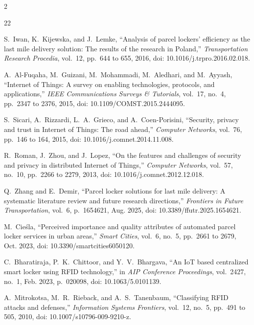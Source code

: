 \documentclass[journal,onecolumn]{IEEEtran}
\begin{document}
\begingroup
\def\IEEEbibitemsep{0pt}
\def\footnotesize{\fontsize{7.0pt}{8.0pt}\selectfont}
\setlength{\multicolsep}{2pt plus 1pt minus 1pt}
\begin{multicols}{2}
\begin{thebibliography}{22}

S.~Iwan, K.~Kijewska, and J.~Lemke, ``Analysis of parcel lockers' efficiency as the last mile delivery solution: The results of the research in Poland,'' \emph{Transportation Research Procedia}, vol.~12, pp.~644 to 655, 2016, doi: 10.1016/j.trpro.2016.02.018.

A.~Al-Fuqaha, M.~Guizani, M.~Mohammadi, M.~Aledhari, and M.~Ayyash, ``Internet of Things: A survey on enabling technologies, protocols, and applications,'' \emph{IEEE Communications Surveys \& Tutorials}, vol.~17, no.~4, pp.~2347 to 2376, 2015, doi: 10.1109/COMST.2015.2444095.

S.~Sicari, A.~Rizzardi, L.~A.~Grieco, and A.~Coen-Porisini, ``Security, privacy and trust in Internet of Things: The road ahead,'' \emph{Computer Networks}, vol.~76, pp.~146 to 164, 2015, doi: 10.1016/j.comnet.2014.11.008.

R.~Roman, J.~Zhou, and J.~Lopez, ``On the features and challenges of security and privacy in distributed Internet of Things,'' \emph{Computer Networks}, vol.~57, no.~10, pp.~2266 to 2279, 2013, doi: 10.1016/j.comnet.2012.12.018.

Q.~Zhang and E.~Demir, ``Parcel locker solutions for last mile delivery: A systematic literature review and future research directions,'' \emph{Frontiers in Future Transportation}, vol.~6, p.~1654621, Aug. 2025, doi: 10.3389/ffutr.2025.1654621.

M.~Cie{\'s}la, ``Perceived importance and quality attributes of automated parcel locker services in urban areas,'' \emph{Smart Cities}, vol.~6, no.~5, pp.~2661 to 2679, Oct. 2023, doi: 10.3390/smartcities6050120.

C.~Bharatiraja, P.~K.~Chittoor, and Y.~V.~Bhargava, ``An IoT based centralized smart locker using RFID technology,'' in \emph{AIP Conference Proceedings}, vol.~2427, no.~1, Feb. 2023, p.~020098, doi: 10.1063/5.0101139.

A.~Mitrokotsa, M.~R.~Rieback, and A.~S.~Tanenbaum, ``Classifying RFID attacks and defenses,'' \emph{Information Systems Frontiers}, vol.~12, no.~5, pp.~491 to 505, 2010, doi: 10.1007/s10796-009-9210-z.


\end{thebibliography}
\end{multicols}
\end{document}

